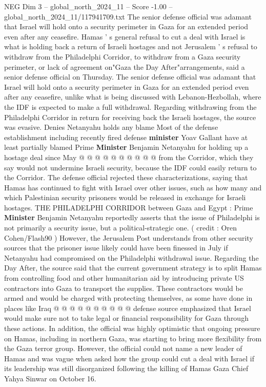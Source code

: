\begin{textsample}{NEG Dim 3 – global\_north\_2024\_11 – Score -1.00 – global\_north\_2024\_11/117941709.txt}  \label{ex:f3_neg_278}
The senior defense official was adamant that Israel will hold onto a security perimeter in Gaza for an extended period even after any ceasefire.
Hamas ' s general refusal to cut a deal with Israel is what is holding back a return of Israeli hostages and not Jerusalem ' s refusal to withdraw from the Philadelphi Corridor, to withdraw from a Gaza security perimeter, or lack of agreement on"Gaza the Day After"arrangements, said a senior defense official on Thursday.
The senior defense official was adamant that Israel will hold onto a security perimeter in Gaza for an extended period even after any ceasefire, unlike what is being discussed with Lebanon-Hezbollah, where the IDF is expected to make a full withdrawal.
Regarding withdrawing from the Philadelphi Corridor in return for receiving back the Israeli hostages, the source was evasive.
Denies Netanyahu holds any blame Most of the defense establishment including recently fired defense \textbf{minister} Yoav Gallant have at least partially blamed Prime \textbf{Minister} Benjamin Netanyahu for holding up a hostage deal since May @ @ @ @ @ @ @ @ @ @ from the Corridor, which they say would not undermine Israeli security, because the IDF could easily return to the Corridor.
The defense official rejected these characterizations, saying that Hamas has continued to fight with Israel over other issues, such as how many and which Palestinian security prisoners would be released in exchange for Israeli hostages.
THE PHILADELPHI CORRIDOR between Gaza and Egypt : Prime \textbf{Minister} Benjamin Netanyahu reportedly asserts that the issue of Philadelphi is not primarily a security issue, but a political-strategic one. ( credit : Oren Cohen/Flash90 ) However, the Jerusalem Post understands from other security sources that the prisoner issue likely could have been finessed in July if Netanyahu had compromised on the Philadelphi withdrawal issue.
Regarding the Day After, the source said that the current government strategy is to split Hamas from controlling food and other humanitarian aid by introducing private US contractors into Gaza to transport the supplies.
These contractors would be armed and would be charged with protecting themselves, as some have done in places like Iraq @ @ @ @ @ @ @ @ @ @ defense source emphasized that Israel would make sure not to take legal or financial responsibility for Gaza through these actions.
In addition, the official was highly optimistic that ongoing pressure on Hamas, including in northern Gaza, was starting to bring more flexibility from the Gaza terror group.
However, the official could not name a new leader of Hamas and was vague when asked how the group could cut a deal with Israel if its leadership was still disorganized following the killing of Hamas Gaza Chief Yahya Sinwar on October 16.

\end{textsample}
